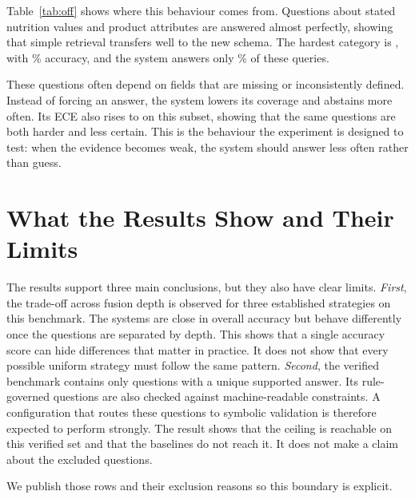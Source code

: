 \documentclass[conference]{IEEEtran}
\begin{document}


Table~\ref{tab:off} shows where this behaviour comes from. Questions about
stated nutrition values and product attributes are answered almost perfectly,
showing that simple retrieval transfers well to the new schema. The hardest
category is \OffHardestType{}, with \OffHardestAcc\% accuracy, and the system
answers only \OffHardestCoverage\% of these queries.

These questions often depend on fields that are missing or inconsistently
defined. Instead of forcing an answer, the system lowers its coverage and
abstains more often. Its ECE also rises to \OffEceHardest{} on this subset,
showing that the same questions are both harder and less certain. This is the
behaviour the experiment is designed to test: when the evidence becomes weak,
the system should answer less often rather than guess.
\section{What the Results Show and Their Limits}
\label{sec:limits}

The results support three main conclusions, but they also have clear limits.
\textit{First}, the trade-off across fusion depth is observed for three established strategies on this benchmark. The systems are close in overall accuracy but behave
differently once the questions are separated by depth. This shows that a single
accuracy score can hide differences that matter in practice. It does not show
that every possible uniform strategy must follow the same pattern.
\textit{Second}, the verified benchmark contains only questions with a unique supported
answer. Its rule-governed questions are also checked against machine-readable
constraints. A configuration that routes these questions to symbolic validation
is therefore expected to perform strongly. The result shows that the ceiling is
reachable on this verified set and that the baselines do not reach it. It does
not make a claim about the \ExcludedRows{} excluded questions. 

We publish those
rows and their exclusion reasons so this boundary is explicit.
\end{document}
